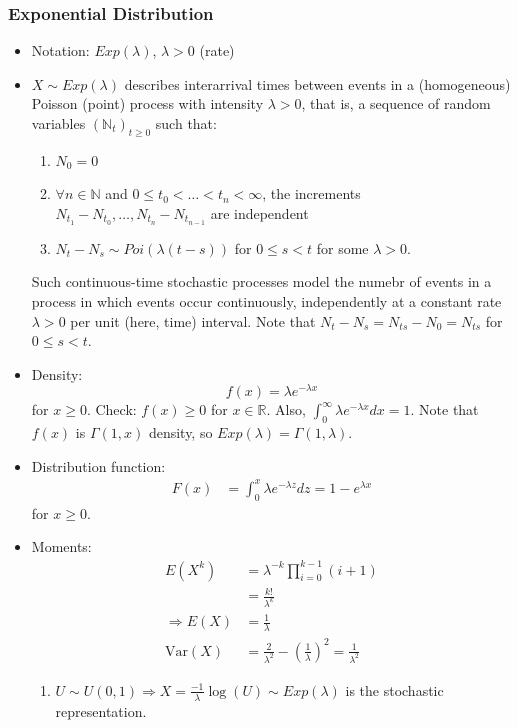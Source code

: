 \documentclass{article}
\newcommand{\R}{\mathbb{R}}
\newcommand{\N}{\mathbb{N}}
\newcommand{\Var}{\mathrm{Var}}
\begin{document}
			\subsubsection{Exponential Distribution}
			\begin{itemize}
				\item Notation: $Exp(\lambda)$, $\lambda>0$ (rate)
				\item $X\sim Exp(\lambda)$ describes interarrival times between events in a (homogeneous) Poisson (point) process with intensity $\lambda>0$, that is, a sequence of random variables $(\N_t)_{t\geq0}$ such that:
				\begin{enumerate}[label=(\roman*)]
					\item $N_0=0$
					\item $\forall n\in\N$ and $0\leq t_0<\dots<t_n<\infty$, the increments $N_{t_1}-N_{t_0}, \dots, N_{t_n}-N_{t_{n-1}}$ are independent
					\item $N_t-N_s\sim Poi(\lambda(t-s))$ for $0\leq s<t$ for some $\lambda>0$.
				\end{enumerate}
				Such continuous-time stochastic processes model the numebr of events in a process in which events occur continuously, independently at a constant rate $\lambda>0$ per unit (here, time) interval. Note that $N_t-N_s=N_{ts}-N_0=N_{ts}$ for $0\leq s<t$.
				\item Density: \[f(x)=\lambda e^{-\lambda x}\] for $x\geq0$.
				Check: $f(x)\geq0$ for $x\in\R$. Also, $\int_0^{\infty}\lambda e^{-\lambda x}dx=1$. Note that $f(x)$ is $\Gamma(1, x)$ density, so $Exp(\lambda)=\Gamma(1, \lambda)$.
				\item Distribution function:
						\begin{align*}
							F(x)&=\int_0^x\lambda e^{-\lambda z}dz=1-e^{\lambda x}
						\end{align*}
						for $x\geq0$.
				\item Moments:
						\begin{align*}
							E(X^k)&=\lambda^{-k}\prod_{i=0}^{k-1}(i+1)\\
							&=\frac{k!}{\lambda^k}\\
							\Rightarrow E(X)&=\frac{1}{\lambda}\\
							\Var(X)&=\frac{2}{\lambda^2}-(\frac{1}{\lambda})^2=\frac{1}{\lambda^2}
						\end{align*}
				\begin{myrem*}{}{}
					\begin{enumerate}
						\item $U\sim U(0, 1)\Rightarrow X=\frac{-1}{\lambda}\log(U)\sim Exp(\lambda)$ is the stochastic representation.
						

\end{enumerate}
\end{myrem*}
\end{itemize}
\end{document}

